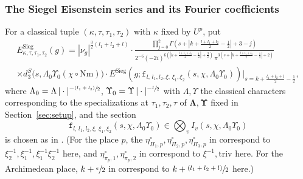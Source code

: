 \documentclass[JEP,XML,SOM,Unicode,published]{cedram}
\newcommand{\psfrac}[2]{\sfrac{(#1)}{#2}}
\theoremstyle{plain}
\theoremstyle{remark}
\let\mr\mathrm
\newcommand{\Nm}{\mathrm{Nm}}
\newcommand{\triv}{\mathrm{triv}}
\newcommand{\Sieg}{\mr{Sieg}}
\newcommand{\dsec}{{\texttt f}}
\newcommand{\sPi}{\scriptscriptstyle{\Pi}}
\newcommand{\bLam}{\boldsymbol\Lambda}
\newcommand{\bUps}{\boldsymbol\Upsilon}
\begin{document}
\subsubsection{The Siegel Eisenstein series and its Fourier coefficients}
For a classical tuple $(\kappa,\tau,\tau_1,\tau_2)$ with $\kappa$ fixed by $U^p$, put
\begin{multline*}
E^\Sieg_{\kappa,\tau,\tau_1,\tau_2}(g)= |\nu_g|^{\frac{3}{2}(l_1+l_2+l)}
\cdot \frac{\prod_{j=0}^2\Gamma\left(s+\left|k+\frac{l+l_1+l_2}{2}-\frac{1}{2}\right|+3-j\right)}{2^{-6}(-2i)^{6\left(\left|k+\frac{l+l_1+l_2}{2}-\frac{1}{2}\right|+\frac{3}{2}\right)}\,\pi^{3\left(s+\left|k+\frac{l+l_1+l_2}{2}-\frac{1}{2}\right|+2\right)}}\\
\times d^S_3\bigl(s,\Lambda_0\Upsilon_0(\chi\circ\Nm)\bigr) \cdot
E^{\Sieg}\left(g;\dsec_{l,\,l_1,l_2,\xi,\,\xi_1,\xi_2}(s,\chi,\Lambda_0\Upsilon_0)\right)\Big|_{s=k+\frac{l_1+l_2+l}{2}-\frac{1}{2}},
\end{multline*}
where $\Lambda_0=\Lambda\,|\cdot|^{-\psfrac{l_1+l_2}{2}}$, $\Upsilon_0=\Upsilon \,|\cdot|^{-\sfrac{l}{2}}$ with $\Lambda,\Upsilon$ the classical characters corresponding to the specializations at $\tau_1,\tau_2,\tau$ of $\bLam,\bUps$ fixed in Section~\ref{sec:setup}, and the section
\[
\dsec_{l,\,l_1,l_2,\xi,\,\xi_1,\xi_2}(s,\chi,\Lambda_0\Upsilon_0)\in\bigotimes_v I_v(s,\chi,\Lambda_0\Upsilon_0)
\]
is chosen as in \cite[\S3.3]{pFL}. (For the place $p$, the $\eta^\circ_{\sPi_1,p},\eta^\circ_{\sPi_2,p},\eta^\circ_{\sPi_3,p}$ in \loccit correspond to $\xi^{-1}_2,\xi^{-1}_1,\xi^{-1}_1\xi^{-1}_2$ here, and $\eta^\circ_{\pi_p,1},\eta^\circ_{\pi_p,2}$ in \loccit correspond to $\xi^{-1},\triv$ here. For the Archimedean place, $k+\sfrac{\epsilon}{2}$ in \loccit correspond to $k+\psfrac{l_1+l_2+l}{2}$ here.)
\end{document}
